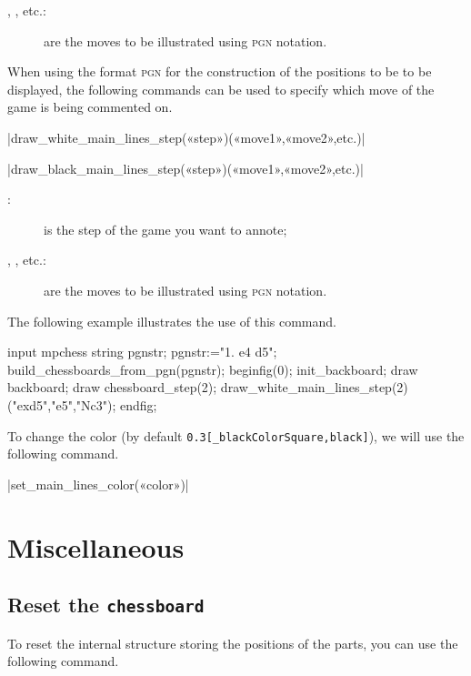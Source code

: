 \documentclass[english]{ltxdoc}
\begin{document}
\begin{description}
  \item[, , etc.:] are the moves to be illustrated using
\textsc{pgn} notation.
\end{description}
  
When using the format \textsc{pgn} for the construction of the positions to be  
to be displayed, the following commands can be used  
to specify which move of the game is being commented on. 

\commande|draw_white_main_lines_step(«step»)(«move1»,«move2»,etc.)|\smallskip

\commande|draw_black_main_lines_step(«step»)(«move1»,«move2»,etc.)|\smallskip

\begin{description}
\item[:] is the step of the game you want to annote; 
\item[, , etc.:] are the moves to be illustrated using
\textsc{pgn} notation.
\end{description}

The following example illustrates the use of this command. 
\begin{ExempleMP}
input mpchess
string pgnstr;
pgnstr:="1. e4 d5";
build_chessboards_from_pgn(pgnstr);
beginfig(0);
init_backboard;
draw backboard;
draw chessboard_step(2);
draw_white_main_lines_step(2)("exd5","e5","Nc3");
endfig;
\end{ExempleMP}

To change the color (by default \lstinline+0.3[_blackColorSquare,black]+),
we will use the following command. 

\commande|set_main_lines_color(«color»)|\smallskip

\section{Miscellaneous}

\subsection{Reset the \lstinline+chessboard+}

To reset the internal structure storing the positions of the parts, you can use
the following command. 
\end{document}
